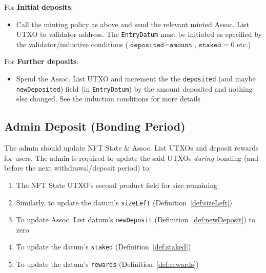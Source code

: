 \documentclass[10pt, a4paper]{article}
\theoremstyle{definition}
\begin{document}
For \textbf{Initial deposits}:
\begin{itemize}
\item{Call the minting policy as above and send the relevant minted Assoc. List UTXO to validator address. The \texttt{EntryDatum} must be initiated as specified by the validator/inductive conditions ($\texttt{deposited} = \texttt{amount}$, $\texttt{staked} = 0$ etc.)}
\end{itemize}
For \textbf{Further deposits}:
\begin{itemize}
\item{Spend the Assoc. List UTXO and increment the the \texttt{deposited} (and maybe \texttt{newDeposited}) field (in \texttt{EntryDatum}) by the amount deposited and nothing else changed. See the induction conditions for more details}
\end{itemize}

\subsection{Admin Deposit (Bonding Period)}\label{subsection:adminDeposit}
The admin should update NFT State \& Assoc. List UTXOs and deposit rewards for users.  The admin is required to update the said UTXOs \textit{during} bonding (and before the next withdrawal/deposit period) to:
\begin{enumerate}
\item{The NFT State UTXO's second product field for size remaining}
\item{Similarly, to update the datum's \texttt{sizeLeft} (Definition~\ref{def:sizeLeft})}
\item{To update Assoc. List datum's \texttt{newDeposit} (Definition~\ref{def:newDeposit}) to zero}
\item{To update the datum's \texttt{staked} (Definition~\ref{def:staked})}
\item{To update the datum's \texttt{rewards} (Definition~\ref{def:rewards})}
\end{enumerate}
\end{document}

